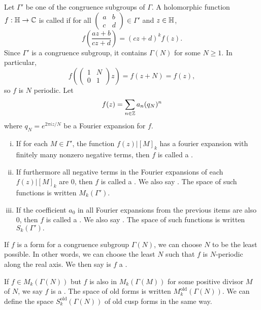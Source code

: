 \documentclass[12pt, a4paper]{report}
\begin{document}
\begin{defn}
  Let $\Gamma'$ be one of the congruence subgroups of $\Gamma$. A holomorphic
  function $f: \mathbb{H} \rightarrow {\mathbb C}$ is called  if for all 
  $\left( 
    \begin{smallmatrix}
      a & b \\ c & d
    \end{smallmatrix}
  \right) \in \Gamma'$ and $z \in \mathbb{H}$,
  \[f \left( \frac{az+b}{cz+d} \right) = (cz+d)^k f(z). \]
  Since $\Gamma'$ is a congruence subgroup, it contains $\Gamma(N)$ for some $N
  \geq 1$. In particular,  $$f \left( \left( 
    \begin{smallmatrix}
      1 & N \\ 0 & 1
    \end{smallmatrix}
  \right) z \right) = f(z+N) = f(z),  $$
  so $f$ is $N$ periodic. Let 
  \[f(z) = \sum\limits_{n \in {\mathbb Z}} a_n(q_N)^n \]
  where $q_N = e^{2\pi i z/N}$ be a Fourier expansion for $f$. 

  \begin{enumerate}[(i)]
  \item If for each $M \in \Gamma'$, the function $f(z) | [M]_k$ has a
  fourier expansion with finitely many nonzero negative terms, then $f$ is
  called a .
\item If furthermore all negative terms in the Fourier expansions of each
  $f(z) | [M]_k$
  are 0, then $f$ is called a . We also say .
  The space of such functions is written $M_k(\Gamma').$
  \item If the coefficient $a_0$ in all Fourier expansions from the previous
    items are also 0, then $f$ is called a . We also say .
    The space of such functions is written $S_k(\Gamma').$ 
  \end{enumerate}
\end{defn}

If $f$ is a form for a congruence subgroup $\Gamma(N)$, we can choose $N$ to be
the least possible. In other words, we can choose the least $N$ such that $f$ is
$N$-periodic along the real axis. We then say is $f$ a .

\begin{defn}
  If $f \in M_k(\Gamma(N))$ but $f$ is also in $M_k(\Gamma(M))$ for some
  positive divisor $M$ of $N$, we say $f$ is a . The space of old forms is written
  $M_k^{\text{old}}(\Gamma(N)).$ We can define the space
  $S_k^{\text{old}}(\Gamma(N))$ of old cusp forms in the same way.  
\end{defn}
\end{document}

